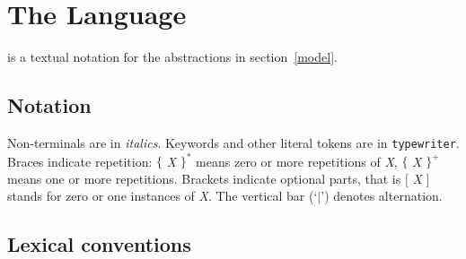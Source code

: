 


%
%
%
%


\section{The Language\label{language}}

\todaysname{} is a textual notation for the abstractions in
section~\ref{model}.

\subsection{Notation}

\def\nont{\em}
\def\tok{\tt}

Non-terminals are in {\nont italics}.  Keywords and other literal
tokens are in {\tok typewriter}.  Braces indicate repetition: $\{$
{\nont X} $\}^*$ means zero or more repetitions of {\nont X}, $\{$
{\nont X} $\}^+$ means one or more repetitions.  Brackets indicate
optional parts, that is $[$ {\nont X} $]$ stands for zero or one
instances of {\nont X}.  The vertical bar (`$|$') denotes
alternation.

\subsection{Lexical conventions\label{lexical}}

